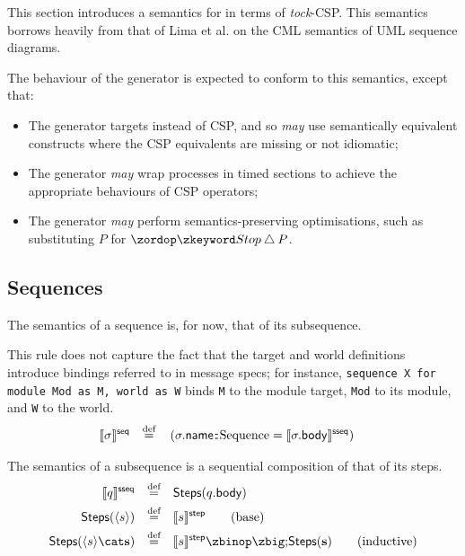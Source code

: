 This section introduces a semantics for \langname{} in terms of
\emph{tock}-CSP.
This semantics borrows heavily from that of Lima et al. on the CML semantics of
UML sequence diagrams.

The behaviour of the \langname{} generator is expected to conform to
this semantics, except that:

\begin{itemize}
\item
	The generator targets \cspm{} instead of CSP, and so \emph{may}
	use semantically equivalent \cspm{} constructs where the CSP equivalents
	are missing or not idiomatic;
\item
	The generator \emph{may}  wrap processes in
	timed sections to achieve the appropriate \tockcsp{} behaviours of
	CSP operators;
\item
	The generator \emph{may} perform semantics-preserving optimisations,
	such as substituting \(P\) for \(\Stop \interrupt P\).
\end{itemize}

\subsection{Sequences}

\begin{defn}[Sequence]

The semantics of a sequence is, for now, that of its subsequence.

This rule does not capture the fact that the target and world definitions
introduce bindings referred to in message specs; for instance,
\lstinline[language=RoboCert]{sequence X for module Mod as M, world as W}
binds \lstinline[language=RoboCert]{M} to the module target,
\lstinline[language=RoboCert]{Mod} to its module, and
\lstinline[language=RoboCert]{W} to the world.
%
\begin{align*}
	\llbracket \sigma \rrbracket^{\mathsf{seq}}
\quad\mathbin{\overset{\text{def}}=}\quad&	
\left(
	\sigma.\mathsf{name} \mathbin{\!:\!:\!} \text{Sequence} =
		\llbracket \sigma.\mathsf{body} \rrbracket^{\mathsf{sseq}}
\right)
\end{align*}

\end{defn}

\begin{defn}[Subsequence]

The semantics of a subsequence is a sequential composition of that of its steps.
%
\begin{align*}
	\sseqsema{\asseq}
	\quad\defeq\quad&	
	\mathsf{Steps}(\field{\asseq}{body})
\\
	\mathsf{Steps}(\langle\astep\rangle)
	\quad\defeq\quad&	
	\stepsema{\astep}
	\tag{base}
\\
	\mathsf{Steps}(\langle\astep\rangle\cat\mathbf{\astep})
	\quad\defeq\quad&	
	\stepsema{\astep} \circseq \mathsf{Steps}(\mathbf{\astep})
	\tag{inductive}
\end{align*}

\end{defn}


